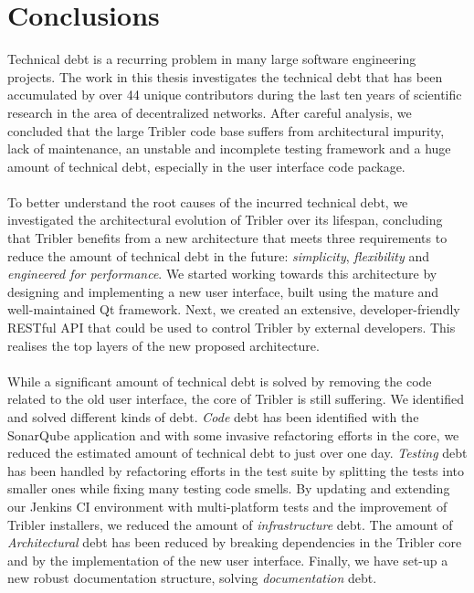 \chapter{Conclusions}
\label{chapter:conclusions}

Technical debt is a recurring problem in many large software engineering projects. The work in this thesis investigates the technical debt that has been accumulated by over 44 unique contributors during the last ten years of scientific research in the area of decentralized networks. After careful analysis, we concluded that the large Tribler code base suffers from architectural impurity, lack of maintenance, an unstable and incomplete testing framework and a huge amount of technical debt, especially in the user interface code package.\\\\
To better understand the root causes of the incurred technical debt, we investigated the architectural evolution of Tribler over its lifespan, concluding that Tribler benefits from a new architecture that meets three requirements to reduce the amount of technical debt in the future: \emph{simplicity}, \emph{flexibility} and \emph{engineered for performance}. We started working towards this architecture by designing and implementing a new user interface, built using the mature and well-maintained Qt framework. Next, we created an extensive, developer-friendly RESTful API that could be used to control Tribler by external developers. This realises the top layers of the new proposed architecture.\\\\
While a significant amount of technical debt is solved by removing the code related to the old user interface, the core of Tribler is still suffering. We identified and solved different kinds of debt. \emph{Code} debt has been identified with the SonarQube application and with some invasive refactoring efforts in the core, we reduced the estimated amount of technical debt to just over one day. \emph{Testing} debt has been handled by refactoring efforts in the test suite by splitting the tests into smaller ones while fixing many testing code smells. By updating and extending our Jenkins CI environment with multi-platform tests and the improvement of Tribler installers, we reduced the amount of \emph{infrastructure} debt. The amount of \emph{Architectural} debt has been reduced by breaking dependencies in the Tribler core and by the implementation of the new user interface. Finally, we have set-up a new robust documentation structure, solving \emph{documentation} debt.\\\\
